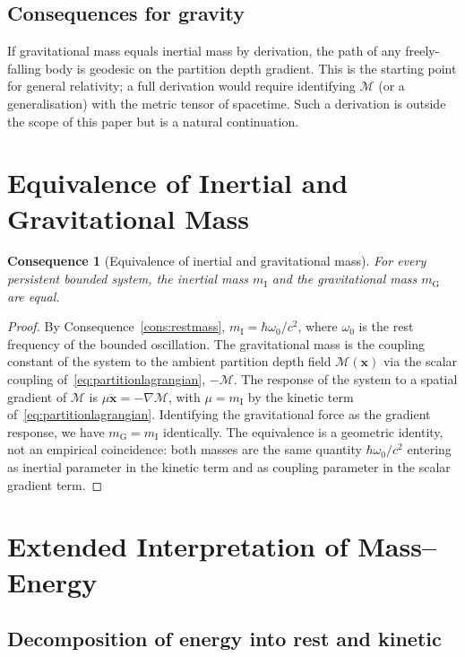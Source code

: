 \documentclass[11pt,twocolumn,a4paper]{article}
\theoremstyle{axiomstyle}
\theoremstyle{conseqstyle}
\newtheorem{consequence}{Consequence}
\theoremstyle{definition}
\theoremstyle{remark}
\newcommand{\Depth}{\mathcal{M}}
\begin{document}
\subsection{Consequences for gravity}

If gravitational mass equals inertial mass by derivation, the path of any freely-falling body is geodesic on the partition depth gradient. This is the starting point for general relativity; a full derivation would require identifying $\Depth$ (or a generalisation) with the metric tensor of spacetime. Such a derivation is outside the scope of this paper but is a natural continuation.

\section{Equivalence of Inertial and Gravitational Mass}
\label{sec:equivmass}

\begin{consequence}[Equivalence of inertial and gravitational mass]
\label{cons:equivmass}
For every persistent bounded system, the inertial mass $m_{\mathrm{I}}$ and the gravitational mass $m_{\mathrm{G}}$ are equal.
\end{consequence}

\begin{proof}
By Consequence~\ref{cons:restmass}, $m_{\mathrm{I}}=\hbar\omega_{0}/c^{2}$, where $\omega_{0}$ is the rest frequency of the bounded oscillation. The gravitational mass is the coupling constant of the system to the ambient partition depth field $\Depth(\mathbf{x})$ via the scalar coupling of~\eqref{eq:partitionlagrangian}, $-\Depth$. The response of the system to a spatial gradient of $\Depth$ is $\mu\ddot{\mathbf{x}}=-\nabla\Depth$, with $\mu=m_{\mathrm{I}}$ by the kinetic term of~\eqref{eq:partitionlagrangian}. Identifying the gravitational force as the gradient response, we have $m_{\mathrm{G}}=m_{\mathrm{I}}$ identically. The equivalence is a geometric identity, not an empirical coincidence: both masses are the same quantity $\hbar\omega_{0}/c^{2}$ entering as inertial parameter in the kinetic term and as coupling parameter in the scalar gradient term.
\end{proof}

\section{Extended Interpretation of Mass--Energy}
\label{sec:extendedEmc2}

\subsection{Decomposition of energy into rest and kinetic}
\end{document}
